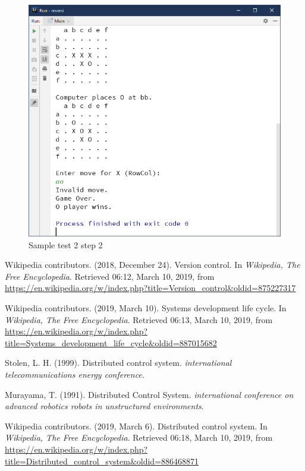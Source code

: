 \documentclass[a4paper]{report}
\begin{document}
\begin{figure}
  \centering
  \includegraphics[width=12cm]{Capture5.png}
  \caption{Sample test 2 step 2}\label{6}
\end{figure}



\begin{thebibliography}{A}

Wikipedia contributors. (2018, December 24). Version control. In \emph{Wikipedia, The Free Encyclopedia}. Retrieved 06:12, March 10, 2019, from \url{https://en.wikipedia.org/w/index.php?title=Version_control&oldid=875227317}

Wikipedia contributors. (2019, March 10). Systems development life cycle. In \emph{Wikipedia, The Free Encyclopedia}. Retrieved 06:13, March 10, 2019, from \url{https://en.wikipedia.org/w/index.php?title=Systems_development_life_cycle&oldid=887015682}

Stolen, L. H. (1999). Distributed control system. \emph{international telecommunications energy conference.}

Murayama, T. (1991). Distributed Control System. \emph{international conference on advanced robotics robots in unstructured environments}.

Wikipedia contributors. (2019, March 6). Distributed control system. In \emph{Wikipedia, The Free Encyclopedia}. Retrieved 06:18, March 10, 2019, from \url{https://en.wikipedia.org/w/index.php?title=Distributed_control_system&oldid=886468871}

\end{thebibliography}
\end{document}
